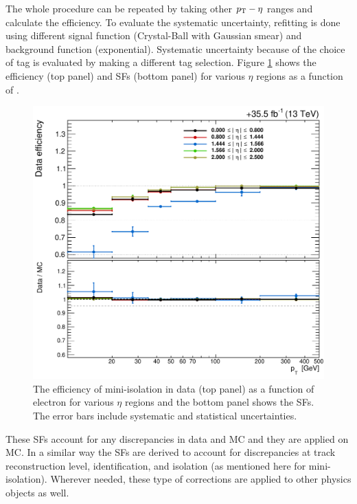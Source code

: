 The whole procedure can be repeated by taking other $p_{\mathrm{T}}-\eta$ ranges and calculate the efficiency. To evaluate the systematic 
uncertainty, refitting is done using different signal function (Crystal-Ball with Gaussian smear) and background function (exponential). 
Systematic uncertainty because of the choice of tag is evaluated by making a different tag selection. Figure \ref{fig:MiniIsoSF} shows the 
efficiency (top panel) and SFs (bottom panel) for various $\eta$ regions as a function of \pt.
\begin{figure}[h!]
\centering
\includegraphics[width=0.6\linewidth]{../Figures/Chap2/MiniIsoSF}
\captionsetup{width=.9\linewidth}
\caption[Mini-isolation efficiency and SF]{The efficiency of mini-isolation in data (top panel) as a function of electron \pt for various $\eta$ regions and the bottom panel shows the SFs. The error bars include systematic and statistical uncertainties.}
\label{fig:MiniIsoSF}
\end{figure}

These SFs account for any discrepancies in data and MC and they are applied on MC. In a similar way the SFs are derived to account for 
discrepancies at track reconstruction level, identification, and isolation (as mentioned here for mini-isolation). Wherever needed, these 
type of corrections are applied to other physics objects as well. 

 

